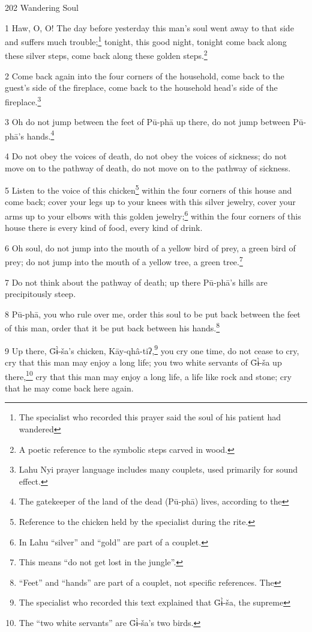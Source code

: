 
202 Wandering Soul

1 Haw, O, O! The day before yesterday this man's soul went away to that side and
suffers much trouble;\footnote{The specialist who recorded this prayer said the soul of his patient had wandered} tonight, this good night, tonight come back along these
silver steps, come back along these golden steps.\footnote{A poetic reference to the symbolic steps carved in wood.}

2 Come back again into the four corners of the household, come back to the guest's
side of the fireplace, come back to the household head's side of the fireplace.\footnote{Lahu Nyi prayer language includes many couplets, used primarily for sound effect.}

3 Oh do not jump between the feet of Pū-phā up there, do not jump between Pū-phā's
hands.\footnote{The gatekeeper of the land of the dead (Pū-phā) lives, according to the}

4 Do not obey the voices of death, do not obey the voices of sickness; do not move
on to the pathway of death, do not move on to the pathway of sickness.

5 Listen to the voice of this chicken\footnote{Reference to the chicken held by the specialist during the rite.} within the four corners of this house
and come back; cover your legs up to your knees with this silver jewelry, cover
your arms up to your elbows with this golden jewelry;\footnote{In Lahu ``silver'' and ``gold'' are part of a couplet.} within the four corners
of this house there is every kind of food, every kind of drink.

6 Oh soul, do not jump into the mouth of a yellow bird of prey, a green bird of
prey; do not jump into the mouth of a yellow tree, a green tree.\footnote{This means ``do not get lost in the jungle''.}

7 Do not think about the pathway of death; up there Pū-phā's hills are precipitously
steep.

8 Pū-phā, you who rule over me, order this soul to be put back between the
feet of this man, order that it be put back between his hands.\footnote{``Feet'' and ``hands'' are part of a couplet, not specific references. The}

9 Up there, G̈ɨ̀-ša's chicken, Kāy-qhâ-tiʔ,\footnote{The specialist who recorded this text explained that G̈ɨ̀-ša, the supreme} you cry one time, do not
cease to cry, cry that this man may enjoy a long life; you two white servants of
G̈ɨ̀-ša up there,\footnote{The ``two white servants'' are G̈ɨ̀-ša's two birds.} cry that this man may enjoy a long life, a life like
rock and stone; cry that he may come back here again.

